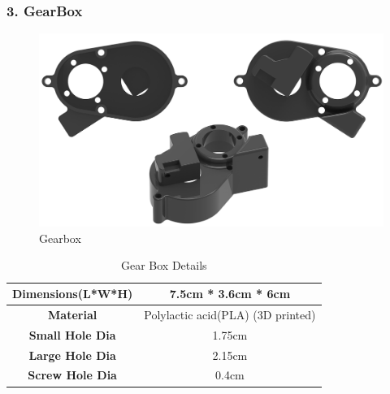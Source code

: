 \documentclass[12pt,a4paper,oneside]{book}
\begin{document}
			\subsubsection*{3. GearBox}
				\begin{figure}[H]
					\centering					
					\includegraphics[scale=1]{GEARBOX FULL}
					\caption{Gearbox}	 
				\end{figure}
				\begin{table}[H]
					\centering
					\def\arraystretch{1.5}
					\caption{Gear Box Details}
					\vspace{0.5cm}
					\begin{tabular}{|c||c|}
					\hline
						\textbf{Dimensions(L*W*H)} & 7.5cm * 3.6cm * 6cm\\\hline
						\textbf{Material} & Polylactic acid(PLA) (3D printed)\\\hline
						\textbf{Small Hole Dia} & 1.75cm\\\hline
						\textbf{Large Hole Dia}	& 2.15cm\\\hline
						\textbf{Screw Hole Dia} & 0.4cm\\\hline
					\end{tabular}
				\end{table}
				\pagebreak
				
\end{document}
